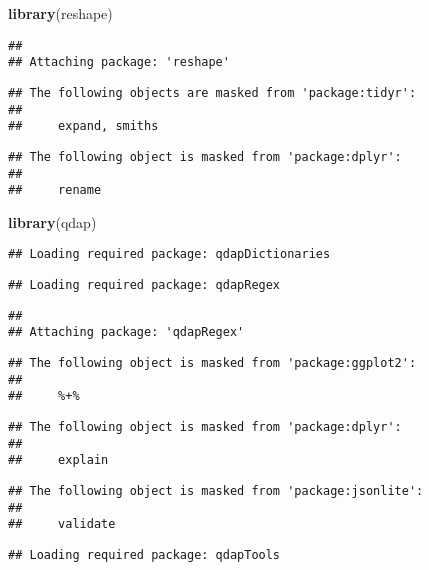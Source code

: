 \documentclass[]{article}
\newenvironment{Shaded}{\begin{snugshade}}{\end{snugshade}}
\newcommand{\KeywordTok}[1]{\textcolor[rgb]{0.13,0.29,0.53}{\textbf{#1}}}
\newcommand{\NormalTok}[1]{#1}
\begin{document}
\begin{Shaded}
\begin{Highlighting}[]
\KeywordTok{library}\NormalTok{(reshape)}
\end{Highlighting}
\end{Shaded}

\begin{verbatim}
## 
## Attaching package: 'reshape'
\end{verbatim}

\begin{verbatim}
## The following objects are masked from 'package:tidyr':
## 
##     expand, smiths
\end{verbatim}

\begin{verbatim}
## The following object is masked from 'package:dplyr':
## 
##     rename
\end{verbatim}

\begin{Shaded}
\begin{Highlighting}[]
\KeywordTok{library}\NormalTok{(qdap)}
\end{Highlighting}
\end{Shaded}

\begin{verbatim}
## Loading required package: qdapDictionaries
\end{verbatim}

\begin{verbatim}
## Loading required package: qdapRegex
\end{verbatim}

\begin{verbatim}
## 
## Attaching package: 'qdapRegex'
\end{verbatim}

\begin{verbatim}
## The following object is masked from 'package:ggplot2':
## 
##     %+%
\end{verbatim}

\begin{verbatim}
## The following object is masked from 'package:dplyr':
## 
##     explain
\end{verbatim}

\begin{verbatim}
## The following object is masked from 'package:jsonlite':
## 
##     validate
\end{verbatim}

\begin{verbatim}
## Loading required package: qdapTools
\end{verbatim}
\end{document}
